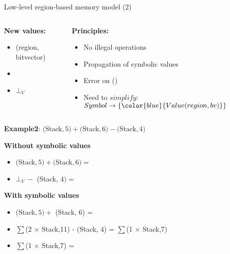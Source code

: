 \begin{frame}{Low-level region-based memory model (2)}
      \begin{columns}[t]
     \begin{column}[T]{3.7cm}
      \textbf{New values:}
      \begin{scriptsize}
      \begin{itemize}
      \item (region, bitvector)
      \item \textbf{\color{blue}{Symbol}}
      \item $\bot_V$
      \end{itemize}
      \end{scriptsize}   
     \end{column}
     \begin{column}[T]{6cm}
      \textbf{Principles:}
      \begin{tiny}
      \begin{itemize}
      \item No illegal operations
      \item Propagation of symbolic values
      \item Error on (\texttt{\color{red}{load, store, jump, ite}})
      \item Need to $simplify:$ $Symbol \rightarrow \lbrace {\color{blue}{Value(region, bv)}} \rbrace$    
      \end{itemize}
      \end{tiny}
     \end{column}
     \end{columns}

      \bigskip
      \textbf{Example2}: $($Stack$, 5) + ($Stack$, 6) - ($Stack$, 4)$

      \medskip


      \textbf{Without symbolic values}
      \begin{itemize}
      \item (Stack$, 5) + ($Stack$, 6) =$ {\color{red}{$\bot_V$}}
      \item $\bot_V \ -$ (Stack, $4) =$ {\color{red}{$\bot_V$}} 
      \end{itemize}
      \pause

      \medskip

      \textbf{With symbolic values}
      \begin{itemize}
      \item (Stack$, 5) +$ (Stack, 6) = {\color{blue}{$\sum$(2 $\times$ Stack,11)}} 
      \item  {$\sum$(2 $\times$ Stack,11)} - (Stack, 4) = {$\sum$(1 $\times$ Stack,7)} 
      \item {$\sum$(1 $\times$ Stack,7)} =  {\color{red}{(Stack,7)}}
      \end{itemize}
\end{frame}



